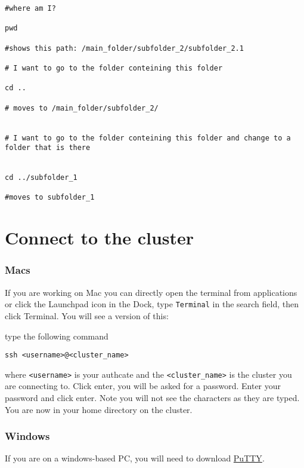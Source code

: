 \documentclass[
]{book}
\begin{document}
\begin{verbatim}
#where am I?

pwd

#shows this path: /main_folder/subfolder_2/subfolder_2.1

# I want to go to the folder conteining this folder

cd ..

# moves to /main_folder/subfolder_2/


# I want to go to the folder conteining this folder and change to a folder that is there


cd ../subfolder_1

#moves to subfolder_1
\end{verbatim}

\hypertarget{connect-to-the-cluster}{%
\chapter{Connect to the cluster}\label{connect-to-the-cluster}}

\hypertarget{macs}{%
\subsection{Macs}\label{macs}}

If you are working on Mac you can directly open the terminal from applications or click the Launchpad icon in the Dock, type \texttt{Terminal} in the search field, then click Terminal. You will see a version of this:

type the following command

\begin{verbatim}
ssh <username>@<cluster_name>
\end{verbatim}

where \texttt{\textless{}username\textgreater{}} is your authcate and the \texttt{\textless{}cluster\_name\textgreater{}} is the cluster you are connecting to. Click enter, you will be asked for a password. Enter your password and click enter. Note you will not see the characters as they are typed. You are now in your home directory on the cluster.

\hypertarget{windows}{%
\subsection{Windows}\label{windows}}

If you are on a windows-based PC, you will need to download \href{https://www.putty.org/}{PuTTY}.
\end{document}

